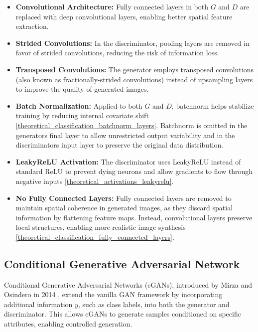 \begin{itemize}
    \item \textbf{Convolutional Architecture:} Fully connected layers in both \(G\) and \(D\) are replaced with deep convolutional layers, enabling better spatial feature extraction.
    \item \textbf{Strided Convolutions:} In the discriminator, pooling layers are removed in favor of strided convolutions, reducing the risk of information loss.
    \item \textbf{Transposed Convolutions:} The generator employs transposed convolutions (also known as fractionally-strided convolutions) instead of upsampling layers to improve the quality of generated images.
    \item \textbf{Batch Normalization:} Applied to both \(G\) and \(D\), batchnorm helps stabilize training by reducing internal covariate shift \ref{theoretical_classification_batchnorm_layers}. Batchnorm is omitted in the generators final layer to allow unrestricted output variability and in the discriminators input layer to preserve the original data distribution.
    \item \textbf{LeakyReLU Activation:} The discriminator uses LeakyReLU instead of standard ReLU to prevent dying neurons and allow gradients to flow through negative inputs \ref{theoretical_activations_leakyrelu}.
    \item \textbf{No Fully Connected Layers:} Fully connected layers are removed to maintain spatial coherence in generated images, as they discard spatial information by flattening feature maps. Instead, convolutional layers preserve local structures, enabling more realistic image synthesis \ref{theoretical_classification_fully_connected_layers}.
\end{itemize}


\subsection[Conditional Generative Adversarial Network - cGAN]{Conditional Generative Adversarial Network}\label{theoretical_cgan}

Conditional Generative Adversarial Networks (cGANs), introduced by Mirza and Osindero in 2014 \cite{mirza2014conditionalgenerativeadversarialnets}, extend the vanilla GAN framework by incorporating additional information \(y\), such as class labels, into both the generator and discriminator. This allows cGANs to generate samples conditioned on specific attributes, enabling controlled generation.

